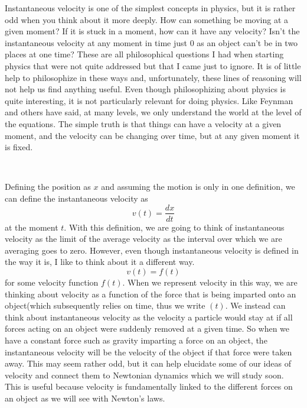 Instantaneous velocity is one of the simplest concepts in physics, but it is rather odd when you think about it more deeply. How can something be moving at a given moment? If it is stuck in a moment, how can it have any velocity? Isn't the instantaneous velocity at any moment in time just 0 as an object can't be in two places at one time? These are all philosophical questions I had when starting physics that were not quite addressed but that I came just to ignore. It is of little help to philosophize in these ways and, unfortunately, these lines of reasoning will not help us find anything useful. Even though philosophizing about physics is quite interesting, it is not particularly relevant for doing physics. Like Feynman and others have said, at many levels, we only understand the world at the level of the equations. The simple truth is that things can have a velocity at a given moment, and the velocity can be changing over time, but at any given moment it is fixed.

\
\vspace{5mm}
\\

Defining the position as $x$ and assuming the motion is only in one definition, we can define the instantaneous velocity as
\begin{equation} \label{eq:a}
v\left(t\right) = \frac{dx}{dt}\end{equation}
at the moment $t$. With this definition, we are going to think of instantaneous velocity as the limit of the average velocity as the interval over which we are averaging goes to zero.  However, even though instantaneous velocity is defined in the way it is, I like to think about it a different way. $$v\left(t\right) = f\left(t\right)$$ for some velocity function $f\left(t\right)$. When we represent velocity in this way, we are thinking about velocity as a function of the force that is being imparted onto an object(which subsequently relies on time, thus we write $\left(t\right)$. We instead can think about instantaneous velocity as the velocity a particle would stay at if all forces acting on an object were suddenly removed at a given time. So when we have a constant force such as gravity imparting a force on an object, the instantaneous velocity will be the velocity of the object if that force were taken away. This may seem rather odd, but it can help elucidate some of our ideas of velocity and connect them to Newtonian dynamics which we will study soon. This is useful because velocity is fundamentally linked to the different forces on an object as we will see with Newton's laws. 

